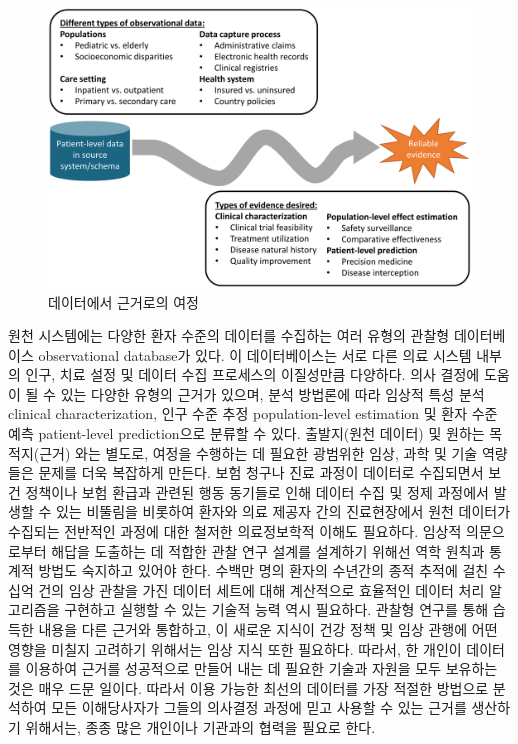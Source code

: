 \documentclass[11pt]{book}
\theoremstyle{definition}
\theoremstyle{definition}
\theoremstyle{definition}
\theoremstyle{remark}
\begin{document}
\begin{figure}

{\centering \includegraphics[width=1\linewidth]{images/OhdsiCommunity/datajourney} 

}

\caption{데이터에서 근거로의 여정}\label{fig:datajourney}
\end{figure}

원천 시스템에는 다양한 환자 수준의 데이터를 수집하는 여러 유형의 관찰형
데이터베이스 observational database가 있다. 이 데이터베이스는 서로 다른
의료 시스템 내부의 인구, 치료 설정 및 데이터 수집 프로세스의 이질성만큼
다양하다. 의사 결정에 도움이 될 수 있는 다양한 유형의 근거가 있으며,
분석 방법론에 따라 임상적 특성 분석 clinical characterization, 인구 수준
추정 population-level estimation 및 환자 수준 예측 patient-level
prediction으로 분류할 수 있다. 출발지(원천 데이터) 및 원하는
목적지(근거) 와는 별도로, 여정을 수행하는 데 필요한 광범위한 임상, 과학
및 기술 역량들은 문제를 더욱 복잡하게 만든다. 보험 청구나 진료 과정이
데이터로 수집되면서 보건 정책이나 보험 환급과 관련된 행동 동기들로 인해
데이터 수집 및 정제 과정에서 발생할 수 있는 비뚤림을 비롯하여 환자와
의료 제공자 간의 진료현장에서 원천 데이터가 수집되는 전반적인 과정에
대한 철저한 의료정보학적 이해도 필요하다. 임상적 의문으로부터 해답을
도출하는 데 적합한 관찰 연구 설계를 설계하기 위해선 역학 원칙과 통계적
방법도 숙지하고 있어야 한다. 수백만 명의 환자의 수년간의 종적 추적에
걸친 수십억 건의 임상 관찰을 가진 데이터 세트에 대해 계산적으로 효율적인
데이터 처리 알고리즘을 구현하고 실행할 수 있는 기술적 능력 역시
필요하다. 관찰형 연구를 통해 습득한 내용을 다른 근거와 통합하고, 이
새로운 지식이 건강 정책 및 임상 관행에 어떤 영향을 미칠지 고려하기
위해서는 임상 지식 또한 필요하다. 따라서, 한 개인이 데이터를 이용하여
근거를 성공적으로 만들어 내는 데 필요한 기술과 자원을 모두 보유하는 것은
매우 드문 일이다. 따라서 이용 가능한 최선의 데이터를 가장 적절한
방법으로 분석하여 모든 이해당사자가 그들의 의사결정 과정에 믿고 사용할
수 있는 근거를 생산하기 위해서는, 종종 많은 개인이나 기관과의 협력을
필요로 한다.
\end{document}
